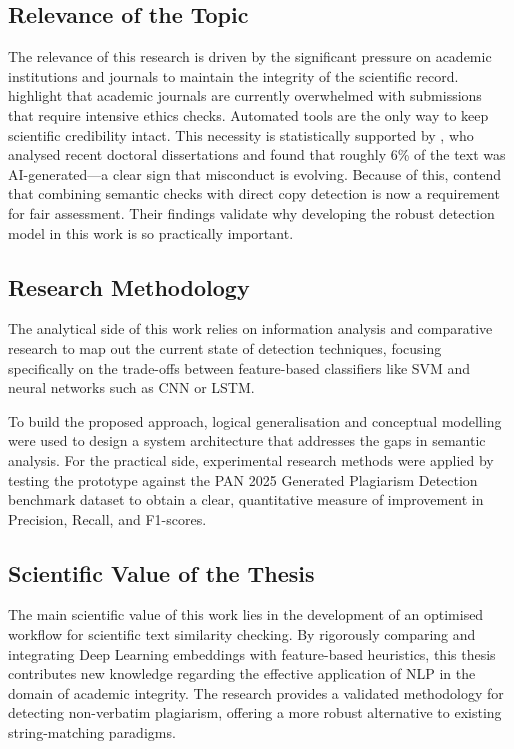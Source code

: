 \documentclass[12pt, a4paper]{article}
\begin{document}
\subsection{Relevance of the Topic}

The relevance of this research is driven by the significant pressure on academic institutions and journals to maintain the integrity of the scientific record. \citet{Alnaimat2025} highlight that academic journals are currently overwhelmed with submissions that require intensive ethics checks. Automated tools are the only way to keep scientific credibility intact. This necessity is statistically supported by \citet{Murch2025}, who analysed recent doctoral dissertations and found that roughly 6\% of the text was AI-generated---a clear sign that misconduct is evolving. Because of this, \citet{Setu2025} contend that combining semantic checks with direct copy detection is now a requirement for fair assessment. Their findings validate why developing the robust detection model in this work is so practically important.

\subsection{Research Methodology}

The analytical side of this work relies on information analysis and comparative research to map out the current state of detection techniques, focusing specifically on the trade-offs between feature-based classifiers like SVM and neural networks such as CNN or LSTM.

To build the proposed approach, logical generalisation and conceptual modelling were used to design a system architecture that addresses the gaps in semantic analysis. For the practical side, experimental research methods were applied by testing the prototype against the PAN 2025 Generated Plagiarism Detection benchmark dataset \citep{GreinerPetter2025} to obtain a clear, quantitative measure of improvement in Precision, Recall, and F1-scores.

\subsection{Scientific Value of the Thesis}

The main scientific value of this work lies in the development of an optimised workflow for scientific text similarity checking. By rigorously comparing and integrating Deep Learning embeddings with feature-based heuristics, this thesis contributes new knowledge regarding the effective application of NLP in the domain of academic integrity. The research provides a validated methodology for detecting non-verbatim plagiarism, offering a more robust alternative to existing string-matching paradigms.
\end{document}
